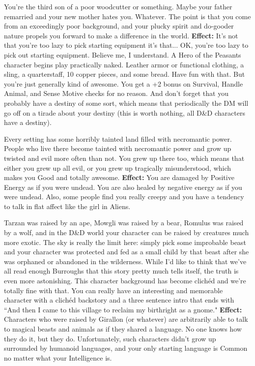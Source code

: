 \medskip{}
{You're the third son of a poor woodcutter or something. Maybe your father remarried and your new mother hates you. Whatever. The point is that you come from an exceedingly poor background, and your plucky spirit and do-gooder nature propels you forward to make a difference in the world.}
\textbf{Effect:}{ It's not that you're too lazy to pick starting equipment it's that... OK, you're too lazy to pick out starting equipment. Believe me, I understand. A Hero of the Peasants character begins play practically naked. Leather armor or functional clothing, a sling, a quarterstaff, 10 copper pieces, and some bread. Have fun with that. But you're just generally kind of awesome. You get a +2 bonus on Survival, Handle Animal, and Sense Motive checks for no reason. And don't forget that you probably have a destiny of some sort, which means that periodically the DM will go off on a tirade about your destiny (this is worth nothing, all D\&D characters have a destiny).}

\medskip{}
{Every setting has some horribly tainted land filled with necromantic power. People who live there become tainted with necromantic power and grow up twisted and evil more often than not. You grew up there too, which means that either you grew up all evil, or you grew up tragically misunderstood, which makes you Good and totally awesome.}
\textbf{Effect:}{ You are damaged by Positive Energy as if you were undead. You are also healed by negative energy as if you were undead. Also, some people find you really creepy and you have a tendency to talk in flat affect like the girl in Aliens.}

\medskip{}
{Tarzan was raised by an ape, Mowgli was raised by a bear, Romulus was raised by a wolf, and in the D\&D world your character can be raised by creatures much more exotic. The sky is really the limit here: simply pick some improbable beast and your character was protected and fed as a small child by that beast after she was orphaned or abandoned in the wilderness. While I'd like to think that we've all read enough Burroughs that this story pretty much tells itself, the truth is even more astonishing. This character background has become clich\'ed and we're totally fine with that. You can really have an interesting and memorable character with a clich\'ed backstory and a three sentence intro that ends with ``And then I came to this village to reclaim my birthright as a gnome."}
\textbf{Effect:}{ Characters who were raised by Girallon (or whatever) are arbitrarily able to talk to magical beasts and animals as if they shared a language. No one knows how they do it, but they do. Unfortunately, such characters didn't grow up surrounded by humanoid languages, and your only starting language is Common no matter what your Intelligence is.}

